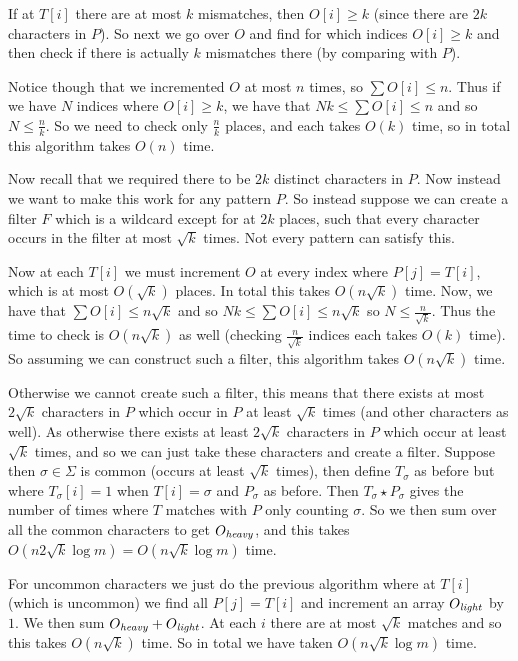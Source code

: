 If at $T[i]$ there are at most $k$ mismatches, then $O[i]\geq k$ (since there are $2k$ characters in $P$).
So next we go over $O$ and find for which indices $O[i]\geq k$ and then check if there is actually $k$ mismatches there (by comparing with $P$).

Notice though that we incremented $O$ at most $n$ times, so $\sum O[i]\leq n$.
Thus if we have $N$ indices where $O[i]\geq k$, we have that $Nk\leq\sum O[i]\leq n$ and so $N\leq\frac nk$.
So we need to check only $\frac nk$ places, and each takes $O(k)$ time, so in total this algorithm takes $O(n)$ time.

Now recall that we required there to be $2k$ distinct characters in $P$.
Now instead we want to make this work for any pattern $P$.
So instead suppose we can create a filter $F$ which is a wildcard except for at $2k$ places, such that every character occurs in the filter at most $\sqrt k$ times.
Not every pattern can satisfy this.

Now at each $T[i]$ we must increment $O$ at every index where $P[j]=T[i]$, which is at most $O(\sqrt k)$ places.
In total this takes $O(n\sqrt k)$ time.
Now, we have that $\sum O[i]\leq n\sqrt k$ and so $Nk\leq\sum O[i]\leq n\sqrt k$ so $N\leq\frac n{\sqrt k}$.
Thus the time to check is $O(n\sqrt k)$ as well (checking $\frac n{\sqrt k}$ indices each takes $O(k)$ time).
So assuming we can construct such a filter, this algorithm takes $O(n\sqrt k)$ time.

Otherwise we cannot create such a filter, this means that there exists at most $2\sqrt k$ characters in $P$ which occur in $P$ at least $\sqrt k$ times (and other characters as well).
As otherwise there exists at least $2\sqrt k$ characters in $P$ which occur at least $\sqrt k$ times, and so we can just take these characters and create a filter.
Suppose then $\sigma\in\Sigma$ is common (occurs at least $\sqrt k$ times), then define $T_\sigma$ as before but where $T_\sigma[i]=1$ when $T[i]=\sigma$ and $P_\sigma$ as before.
Then $T_\sigma\star P_\sigma$ gives the number of times where $T$ matches with $P$ only counting $\sigma$.
So we then sum over all the common characters to get $O_{\it heavy}$, and this takes $O(n2\sqrt k\log m)=O(n\sqrt k\log m)$ time.

For uncommon characters we just do the previous algorithm where at $T[i]$ (which is uncommon) we find all $P[j]=T[i]$ and increment an array $O_{\it light}$ by $1$.
We then sum $O_{\it heavy}+O_{\it light}$.
At each $i$ there are at most $\sqrt k$ matches and so this takes $O(n\sqrt k)$ time.
So in total we have taken $O(n\sqrt k\log m)$ time.

